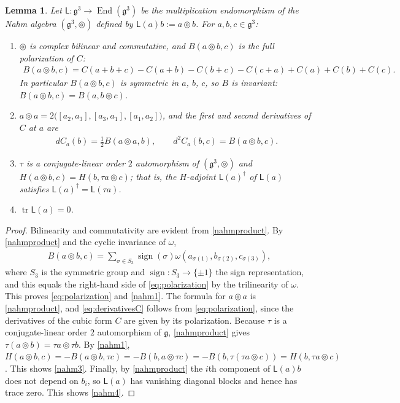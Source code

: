 \documentclass [leqno, 10pt]{amsart}
\newtheorem{lemma}[theorem]{Lemma}%
\theoremstyle{definition}
\numberwithin{equation}{section}
\newcommand{\tmlt}{\circledcirc}
\newcommand{\om}{\omega}
\newcommand{\eno}{\operatorname{End}}
\newcommand{\lin}{\mathsf{L}}
\newcommand{\si}{\sigma}
\newcommand{\g}{\mathfrak{g}}
\newcommand{\tr}{\operatorname{tr}}
\newcommand{\sgn}{\operatorname{sign}}
\begin{document}
\begin{lemma}\label{lem:nahmbasic}
Let $\lin:\g^{3} \to \eno(\g^{3})$ be the multiplication endomorphism of the Nahm algebra $(\g^{3}, \tmlt)$ defined by $\lin(a)b := a \tmlt b$. 
For $a, b, c \in \g^{3}$:
\begin{enumerate}[label=(\arabic*), ref=(\arabic*)]
\item\label{nahm1} $\tmlt$ is complex bilinear and commutative, and $B(a \tmlt b, c)$ is the full polarization of $C$:
\begin{align}\label{eq:polarization}
B(a \tmlt b, c) = C(a + b + c) - C(a+b) - C(b+c) - C(c+a) + C(a) + C(b) + C(c).
\end{align}
In particular $B(a \tmlt b, c)$ is symmetric in $a$, $b$, $c$, so $B$ is invariant: $B(a \tmlt b, c) = B(a, b \tmlt c)$.
\item\label{nahm2} $a \tmlt a = 2\big([a_{2}, a_{3}], [a_{3}, a_{1}], [a_{1}, a_{2}]\big)$, and the first and second derivatives of $C$ at $a$ are
\begin{align}\label{eq:derivativesC}
dC_{a}(b) = \tfrac{1}{2}B(a \tmlt a, b), \qquad d^{2}C_{a}(b, c) = B(a \tmlt b, c).
\end{align}
\item\label{nahm3} $\tau$ is a conjugate-linear order $2$ automorphism of $(\g^{3}, \tmlt)$ and $H(a\tmlt b, c) = H(b, \tau a \tmlt c)$; that is, the $H$-adjoint $\lin(a)^{\dagger}$ of $\lin(a)$ satisfies $\lin(a)^{\dagger} = \lin(\tau a)$.
\item\label{nahm4} $\tr \lin(a) = 0$.
\end{enumerate}
\end{lemma}
\begin{proof}
Bilinearity and commutativity are evident from \eqref{nahmproduct}. By \eqref{nahmproduct} and the cyclic invariance of $\om$,
\begin{align}\label{eq:polarizationproof}
B(a \tmlt b, c) = \sum_{\si \in S_{3}}\sgn(\si)\om(a_{\si(1)}, b_{\si(2)}, c_{\si(3)}),
\end{align}
where $S_{3}$ is the symmetric group and $\sgn:S_{3}\to \{\pm 1\}$ the sign representation, and this equals the right-hand side of \eqref{eq:polarization} by the trilinearity of $\om$.
This proves \eqref{eq:polarization} and \ref{nahm1}. The formula for $a \tmlt a$ is \eqref{nahmproduct}, and \eqref{eq:derivativesC} follows from \eqref{eq:polarization}, since the derivatives of the cubic form $C$ are given by its polarization. Because $\tau$ is a conjugate-linear order $2$ automorphism of $\g$, \eqref{nahmproduct} gives $\tau(a \tmlt b) = \tau a \tmlt \tau b$. By \ref{nahm1}, $H(a \tmlt b, c) = -B(a \tmlt b, \tau c) = -B(b, a \tmlt \tau c) = -B(b, \tau(\tau a \tmlt c)) = H(b, \tau a \tmlt c)$. This shows \ref{nahm3}.
Finally, by \eqref{nahmproduct} the $i$th component of $\lin(a)b$ does not depend on $b_{i}$, so $\lin(a)$ has vanishing diagonal blocks and hence has trace zero. This shows \ref{nahm4}.
\end{proof}
\end{document}
